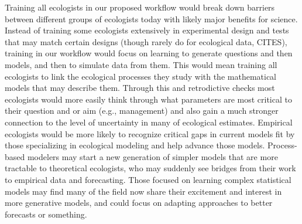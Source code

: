 \documentclass[11pt]{article}
\begin{document}
Training all ecologists in our proposed workflow would break down barriers between different groups of ecologists today with likely major benefits for science. Instead of training some ecologists extensively in experimental design and tests that may match certain designs (though rarely do for ecological data, CITES), training in our workflow would focus on learning to generate questions and then models, and then to simulate data from them. This would mean training all ecologists to link the ecological processes they study with the mathematical models that may describe them. Through this and retrodictive checks most ecologists would more easily think through what parameters are most critical to their question and or aim (e.g., management) and also gain a much stronger connection to the level of uncertainty in many of ecological estimates. Empirical ecologists would be more likely to recognize critical gaps in current models fit by those specializing in ecological modeling and help advance those models. Process-based modelers may start a new generation of simpler models that are more tractable to theoretical ecologists, who may suddenly see bridges from their work to empirical data and forecasting. 
Those focused on learning complex statistical models may find many of the field now share their excitement and interest in more generative models, and could focus on adapting approaches to better forecasts or something.

\end{document}

